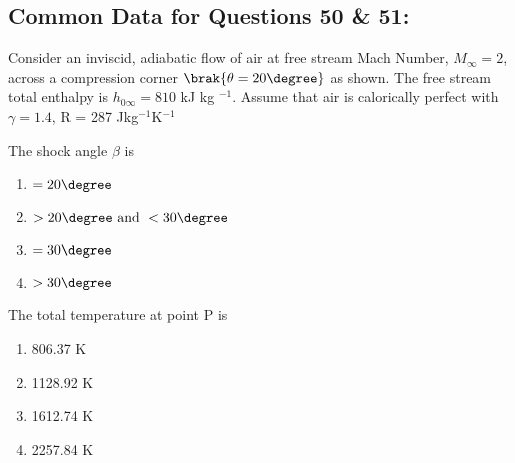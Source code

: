 \subsection*{Common Data for Questions 50 \& 51:}
Consider an inviscid, adiabatic flow of air at free stream Mach Number, $M_{\infty} = 2$, across a compression corner $\brak{\theta = 20 \degree}$ as shown. The free stream total enthalpy is $h_{0 \infty} = 810$ kJ kg $^{-1}$. Assume that air is calorically perfect with $\gamma = 1.4$, R = 287 Jkg$^{-1}$K$^{-1}$\\
\centering
{}
\item The shock angle $\beta$ is
\begin{multicols}{2}
    \begin{enumerate}
        \item $=20 \degree$
        \item $>20 \degree \text{ and } <30 \degree$
        \item $ = 30 \degree$
        \item $>30 \degree$
    \end{enumerate}
\end{multicols}
\item The total temperature at point P is
\begin{multicols}{2}
    \begin{enumerate}
        \item 806.37 K
        \item 1128.92 K
        \item 1612.74 K
        \item 2257.84 K
    \end{enumerate}
\end{multicols}


